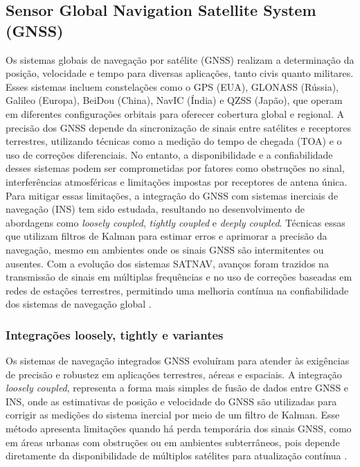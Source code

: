 \subsection{Sensor Global Navigation Satellite System (GNSS)}

Os sistemas globais de navegação por satélite (GNSS) realizam a determinação da posição, velocidade e tempo para diversas aplicações, tanto civis quanto militares. Esses sistemas incluem constelações como o GPS (EUA), GLONASS (Rússia), Galileo (Europa), BeiDou (China), NavIC (Índia) e QZSS (Japão), que operam em diferentes configurações orbitais para oferecer cobertura global e regional. A precisão dos GNSS depende da sincronização de sinais entre satélites e receptores terrestres, utilizando técnicas como a medição do tempo de chegada (TOA) e o uso de correções diferenciais. No entanto, a disponibilidade e a confiabilidade desses sistemas podem ser comprometidas por fatores como obstruções no sinal, interferências atmosféricas e limitações impostas por receptores de antena única. Para mitigar essas limitações, a integração do GNSS com sistemas inerciais de navegação (INS) tem sido estudada, resultando no desenvolvimento de abordagens como \textit{loosely coupled}, \textit{tightly coupled} e \textit{deeply coupled}. Técnicas essas que utilizam filtros de Kalman para estimar erros e aprimorar a precisão da navegação, mesmo em ambientes onde os sinais GNSS são intermitentes ou ausentes. Com a evolução dos sistemas SATNAV, avanços foram trazidos na transmissão de sinais em múltiplas frequências e no uso de correções baseadas em redes de estações terrestres, permitindo uma melhoria contínua na confiabilidade dos sistemas de navegação global \citep{kaplan2017}.

\subsubsection{Integrações loosely, tightly e variantes}

Os sistemas de navegação integrados GNSS evoluíram para atender às exigências de precisão e robustez em aplicações terrestres, aéreas e espaciais. A integração \textit{loosely coupled}, representa a forma mais simples de fusão de dados entre GNSS e INS, onde as estimativas de posição e velocidade do GNSS são utilizadas para corrigir as medições do sistema inercial por meio de um filtro de Kalman. Esse método apresenta limitações quando há perda temporária dos sinais GNSS, como em áreas urbanas com obstruções ou em ambientes subterrâneos, pois depende diretamente da disponibilidade de múltiplos satélites para atualização contínua \citep{falco2017}.

